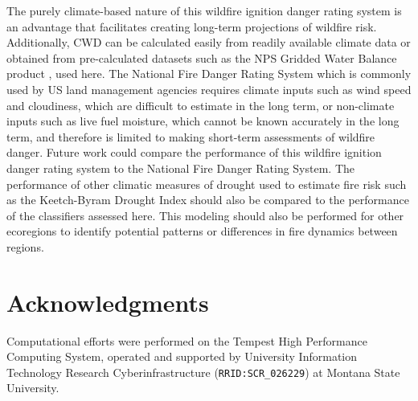 \documentclass[11p]{article}
\begin{document}
The purely climate-based nature of this wildfire ignition danger rating system is an advantage that facilitates creating long-term projections of wildfire risk. Additionally, CWD can be calculated easily from readily available climate data or obtained from pre-calculated datasets such as the NPS Gridded Water Balance product \citep{tercekHistoricalChangesPlant2021}, used here. The National Fire Danger Rating System \citep{degrootChapter11Wildland2015} which is commonly used by US land management agencies requires climate inputs such as wind speed and cloudiness, which are difficult to estimate in the long term, or non-climate inputs such as live fuel moisture, which cannot be known accurately in the long term, and therefore is limited to making short-term assessments of wildfire danger. Future work could compare the performance of this wildfire ignition danger rating system to the National Fire Danger Rating System. The performance of other climatic measures of drought used to estimate fire risk such as the Keetch-Byram Drought Index \citep{degrootChapter11Wildland2015} should also be compared to the performance of the classifiers assessed here. This modeling should also be performed for other ecoregions to identify potential patterns or differences in fire dynamics between regions. 

\section{Acknowledgments}

Computational efforts were performed on the Tempest High Performance Computing System, operated and supported by University Information Technology Research Cyberinfrastructure (\texttt{RRID:SCR\_026229}) at Montana State University.

\clearpage

\printbibliography[
heading=bibintoc,
title={References}
]
\end{document}
